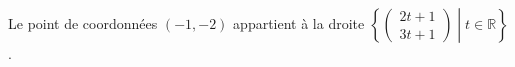 Le point de coordonnées $(-1,-2)$ appartient à la droite  $\left\{\begin{pmatrix}2t+1\\3t+1\end{pmatrix}\middle| t\in\mathbb{R}\right\}$.

\begin{reponses}
\end{reponses}

